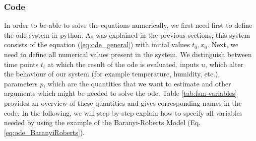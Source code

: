 \documentclass[10pt,A4paper]{article}
\begin{document}
\subsubsection*{Code}
In order to be able to solve the equations numerically, we first need first to define the \ac{ode} system in python. 
As was explained in the previous sections, this system consists of the equation (\ref{eq:ode_general}) with initial values $t_0,x_0$. 
Next, we need to define all numerical values present in the system. 
We distinguish between time points $t_i$ at which the result of the \ac{ode} is evaluated, inputs $u$, which alter the behaviour of our system (for example temperature, humidity, etc.), parameters $p$, which are the quantities that we want to estimate and other arguments which might be needed to solve the \ac{ode}. 
Table \ref{tab:fsm-variables} provides an overview of these quantities and gives corresponding names in the code. 
In the following, we will step-by-step explain how to specify all variables needed by using the example of the Baranyi-Roberts Model (Eq. \ref{eq:ode_BaranyiRoberts}).
\end{document}
